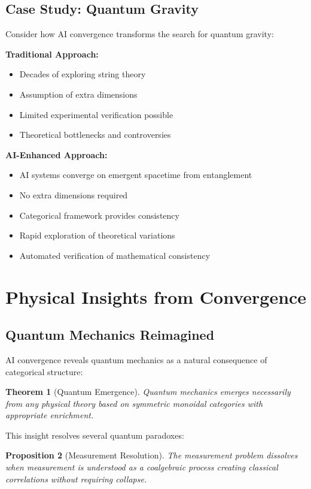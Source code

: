 \documentclass[11pt,a4paper]{article}
\newtheorem{theorem}{Theorem}[section]
\newtheorem{proposition}[theorem]{Proposition}
\begin{document}
\subsection{Case Study: Quantum Gravity}

Consider how AI convergence transforms the search for quantum gravity:

\textbf{Traditional Approach:}
\begin{itemize}
    \item Decades of exploring string theory
    \item Assumption of extra dimensions
    \item Limited experimental verification possible
    \item Theoretical bottlenecks and controversies
\end{itemize}

\textbf{AI-Enhanced Approach:}
\begin{itemize}
    \item AI systems converge on emergent spacetime from entanglement
    \item No extra dimensions required
    \item Categorical framework provides consistency
    \item Rapid exploration of theoretical variations
    \item Automated verification of mathematical consistency
\end{itemize}

\section{Physical Insights from Convergence}

\subsection{Quantum Mechanics Reimagined}

AI convergence reveals quantum mechanics as a natural consequence of categorical structure:

\begin{theorem}[Quantum Emergence]
Quantum mechanics emerges necessarily from any physical theory based on symmetric monoidal categories with appropriate enrichment.
\end{theorem}

This insight resolves several quantum paradoxes:

\begin{proposition}[Measurement Resolution]
The measurement problem dissolves when measurement is understood as a coalgebraic process creating classical correlations without requiring collapse.
\end{proposition}
\end{document}

